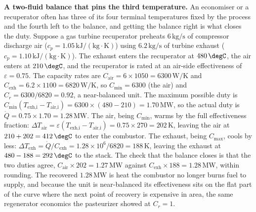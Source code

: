 \textbf{A two-fluid balance that pins the third temperature.} An economiser or a
recuperator often has three of its four terminal temperatures fixed by the process
and the fourth left to the balance, and getting the balance right is what closes the
duty. Suppose a gas turbine recuperator preheats $6\,\text{kg/s}$ of compressor
discharge air ($c_p = 1.05\,\text{kJ}/(\text{kg}\cdot\si{\kelvin})$) using
$6.2\,\text{kg/s}$ of turbine exhaust ($c_p = 1.10\,\text{kJ}/(\text{kg}\cdot
\si{\kelvin})$). The exhaust enters the recuperator at $480\,\degC$, the air enters
at $210\,\degC$, and the recuperator is rated at an air-side effectiveness of
$\varepsilon = 0.75$. The capacity rates are $C_{\text{air}} = 6\times 1050 =
6300\,\si{\watt\per\kelvin}$ and $C_{\text{exh}} = 6.2\times 1100 = 6820\,\si{\watt
\per\kelvin}$, so $C_{\min} = 6300$ (the air) and $C_r = 6300/6820 = 0.92$, a
near-balanced unit. The maximum possible duty is $C_{\min}(T_{\text{exh,i}} -
T_{\text{air,i}}) = 6300\times (480 - 210) = 1.70\,\text{MW}$, so the actual duty is
$\dot{Q} = 0.75\times 1.70 = 1.28\,\text{MW}$. The air, being $C_{\min}$, warms by
the full effectiveness fraction: $\Delta T_{\text{air}} = \varepsilon(T_{\text{exh,i}}
- T_{\text{air,i}}) = 0.75\times 270 = 202\,\si{\kelvin}$, leaving the air at
$210 + 202 = 412\,\degC$ to enter the combustor. The exhaust, being $C_{\max}$,
cools by less: $\Delta T_{\text{exh}} = \dot{Q}/C_{\text{exh}} = 1.28\times 10^6/
6820 = 188\,\si{\kelvin}$, leaving the exhaust at $480 - 188 = 292\,\degC$ to the
stack. The check that the balance closes is that the two duties agree,
$C_{\text{air}}\times 202 = 1.27\,\text{MW}$ against $C_{\text{exh}}\times 188 =
1.28\,\text{MW}$, within rounding. The recovered $1.28\,\text{MW}$ is heat the
combustor no longer burns fuel to supply, and because the unit is near-balanced its
effectiveness sits on the flat part of the curve where the next point of recovery
is expensive in area, the same regenerator economics the pasteurizer showed at
$C_r = 1$.

